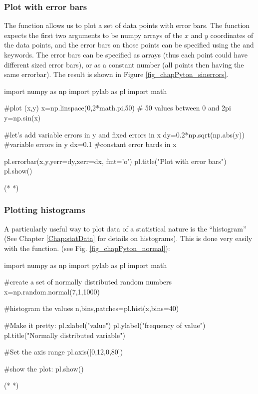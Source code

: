 \subsubsection{Plot with error bars}
The  function allows us to plot a set of data points with error bars. The function expects the first two arguments to be numpy arrays of the $x$ and $y$ coordinates of the data points, and the error bars on those points can be specified using the  and  keywords. The error bars can be specified as arrays (thus each point could have different sized error bars), or as a constant number (all points then having the same errorbar). The result is shown in Figure \ref{fig_chapPyton_sinerrors}.

\begin{python}[caption = Pylab to make a plot with error bars]
import numpy as np
import pylab as pl
import math 

#plot (x,y) 
x=np.linspace(0,2*math.pi,50) # 50 values between 0 and 2pi
y=np.sin(x)

#let's add variable errors in y and fixed errors in x
dy=0.2*np.sqrt(np.abs(y)) #variable errors in y
dx=0.1 #constant error bards in x

pl.errorbar(x,y,yerr=dy,xerr=dx, fmt='o') 
pl.title("Plot with error bars")
pl.show()

\end{python} 
\begin{poutput}
(* *)
\end{poutput}

\subsubsection{Plotting histograms}
\label{subsub:pythonhist}
A particularly useful way to plot data of a statistical nature is the ``histogram'' (See Chapter \ref{Chap:statData} for details on histograms). This is done very easily with the  function. (see Fig. \ref{fig_chapPyton_normal}):

\begin{python}[caption = Pylab to plot a histogram]
import numpy as np
import pylab as pl
import math 

#create a set of normally distributed random numbers
x=np.random.normal(7,1,1000)

#histogram the values
n,bins,patches=pl.hist(x,bins=40)

#Make it pretty:
pl.xlabel("value")
pl.ylabel("frequency of value")
pl.title("Normally distributed variable")

#Set the axis range
pl.axis([0,12,0,80])

#show the plot:
pl.show()

\end{python} 
\begin{poutput}
(*  *)
\end{poutput}

